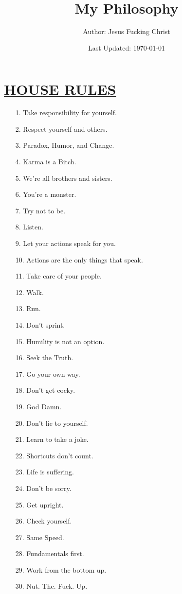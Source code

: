 \documentclass[11pt]{article}
\title{	
	\normalfont \normalsize 
	\huge My Philosophy
}
\author{Author: Jesus Fucking Christ}
\date{Last Updated: \normalsize\today}
\begin{document}
\maketitle
\section*{\ul{HOUSE RULES}}
\begin{enumerate}
	
	\item[1.] Take responsibility for yourself.
	\item[2.] Respect yourself and others.
	\item[3.] Paradox, Humor, and Change.
	\item[4.] Karma is a Bitch.
	\item[5.] We're all brothers and sisters.
	\item[6.] You're a monster.
	\item[7.] Try not to be.
	\item[8.] Listen.
	\item[9.] Let your actions speak for you.
	\item[10.] Actions are the only things that speak.
	\item[11.] Take care of your people.
	\item[12.] Walk.
	\item[13.] Run.
	\item[14.] Don't sprint.
	\item[15.] Humility is not an option.
	\item[16.] Seek the Truth.
	\item[17.] Go your own way.
	\item[18.] Don't get cocky.
	\item[19.] God Damn.
	\item[20.] Don't lie to yourself.
	\item[21.] Learn to take a joke.
	\item[22.] Shortcuts don't count.
	\item[23.] Life is suffering.
	\item[24.] Don't be sorry.
	\item[25.] Get upright.
	\item[26.] Check yourself.
	\item[27.] Same Speed.
	\item[28.] Fundamentals first.
	\item[29.] Work from the bottom up.
	\item[30.] Nut. The. Fuck. Up.

\end{enumerate}
\end{document}
